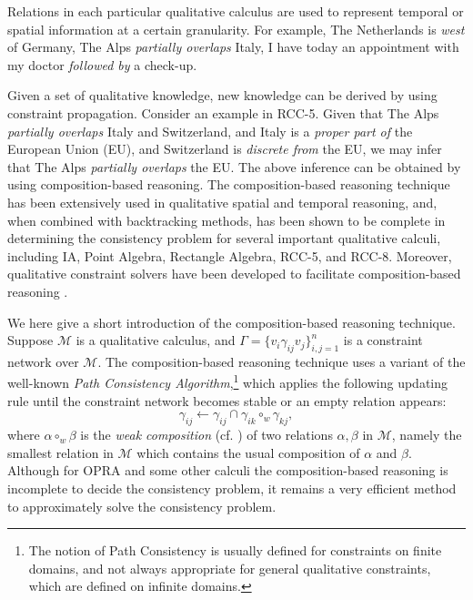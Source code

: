 \documentclass{llncs}
\newcommand{\qcm}{\mathcal{M}}
\begin{document}
Relations in each particular qualitative calculus are used to represent temporal or spatial information at a certain granularity.  For example, The Netherlands is \emph{west} of Germany, The Alps \emph{partially overlaps} Italy, I have today an appointment with my doctor \emph{followed by} a check-up.

Given a set of qualitative knowledge, new knowledge can be derived by using constraint propagation. Consider an example in RCC-5. Given that The Alps \emph{partially overlaps} Italy and Switzerland, and Italy is a \emph{proper part of} the European Union (EU), and Switzerland is \emph{discrete from} the EU, we may infer that The Alps \emph{partially overlaps} the EU. The above inference can be obtained by using composition-based reasoning.  The composition-based reasoning technique has been extensively used in qualitative spatial and temporal reasoning, and, when combined with backtracking methods, has been shown to be complete in determining the consistency problem for several important qualitative calculi, including IA, Point Algebra, Rectangle Algebra, RCC-5, and RCC-8. Moreover, qualitative constraint solvers have been developed to facilitate composition-based reasoning \cite{WallgrunFWDF06,WestphalWG09}.

We here give a short introduction of the composition-based reasoning technique. Suppose $\qcm$ is a qualitative calculus, and $\Gamma=\{v_i\gamma_{ij} v_j\}_{i,j=1}^n$ is a constraint network over $\qcm$. The composition-based reasoning technique uses a variant of the well-known \emph{Path Consistency Algorithm},\footnote{The notion of Path Consistency is usually defined for constraints on finite domains, and not always appropriate for general qualitative constraints, which are defined on infinite domains.}  which applies the following updating rule until the constraint network becomes stable or an empty relation appears:
\begin{equation}\label{eq:pca}
\gamma_{ij}\leftarrow \gamma_{ij}\cap \gamma_{ik}\circ_w\gamma_{kj},
\end{equation}
where $\alpha\circ_w\beta$ is the \emph{weak composition}  (cf. \cite{LiY03,RenzL05}) of two relations $\alpha,\beta$ in $\qcm$, namely the smallest relation in $\qcm$ which contains the usual composition of $\alpha$ and $\beta$.  Although for OPRA and some other calculi the composition-based reasoning is incomplete to decide the consistency problem, it remains a very efficient method to approximately solve the consistency problem.
\end{document}
